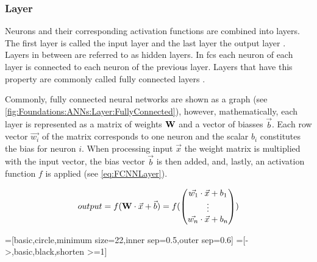 \subsubsection{Layer}
\label{sec:Foundations:NeuralNetworks:Layer}

Neurons and their corresponding activation functions are combined into layers. The first layer is called the input layer and the last layer the output layer \cite{nielsen2015neural}. Layers in between are referred to as hidden layers. In \acp{fc}  each neuron of each layer is connected to each neuron of the previous layer. Layers that have this property are commonly called fully connected layers . 

Commonly, fully connected neural networks are shown as a graph (see \autoref{fig:Foundations:ANNs:Layer:FullyConnected}), however, mathematically, each layer is represented as a matrix of weights $\mathbf{W}$ and a vector of biasses $\vec{b}$. Each row vector $\vec{w_i}$ of the matrix corresponds to one neuron and the scalar $b_i$ constitutes the bias for neuron $i$. When processing input $\vec{x}$ the weight matrix is multiplied with the input vector, the bias vector $\vec{b}$ is then added, and, lastly, an activation function $f$ is applied (see \autoref{eq:FCNNLayer}).

\begin{equation}
    \label{eq:FCNNLayer}
    output = f(\mathbf{W} \cdot \vec{x} + \vec{b}) = f( \begin{pmatrix}
        \vec{w_1} \cdot \vec{x} + b_1\\
        \vdots \\
        \vec{w_n} \cdot \vec{x} + b_n
      \end{pmatrix} )
\end{equation}

\tikzset{>=latex} %
=[basic,circle,minimum size=22,inner sep=0.5,outer sep=0.6]
=[->,basic,black,shorten >=1]
\def\nstyle{int(\lay<\Nnodlen?min(2,\lay):3)} %

